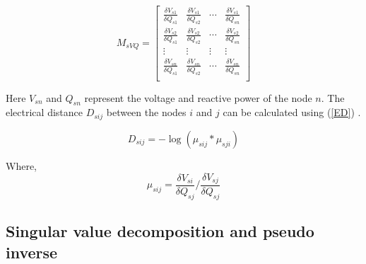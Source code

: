 \begin{equation}\label{MsVq_expan}
M_{sVQ} =
\begin{bmatrix}
\frac{\delta V_{s1}}{\delta Q_{s1}}  & \frac{\delta V_{s1}}{\delta Q_{s2}} & \cdots & \frac{\delta V_{s1}}{\delta Q_{sn}}\\

\frac{\delta V_{s2}}{\delta Q_{s1}}  & \frac{\delta V_{s2}}{\delta Q_{s2}} & \cdots & \frac{\delta V_{s2}}{\delta Q_{sn}}\\

\vdots & \vdots & \vdots & \vdots\\

\frac{\delta V_{sn}}{\delta Q_{s1}}  & \frac{\delta V_{sn}}{\delta Q_{s2}} & \cdots & \frac{\delta V_{sn}}{\delta Q_{sn}}\\ 
\end{bmatrix}
\end{equation}
 
Here $V_{sn}$ and $Q_{sn}$ represent the voltage and reactive power of the node $n$. The electrical distance $D_{sij}$ between the nodes $i$ and $j$ can be calculated using (\ref{ED}) \cite{int1}. 

\begin{equation}\label{ED}
D_{sij} = -\log (\mu_{sij} * \mu_{sji})
\end{equation}

Where,
\begin{equation}
\mu_{sij} =  \frac{\delta V_{si}}{\delta Q_{sj}} / \frac{\delta V_{sj}}{\delta Q_{sj}}
\end{equation}


\subsection{Singular value decomposition and pseudo inverse}\label{svd}



% 


